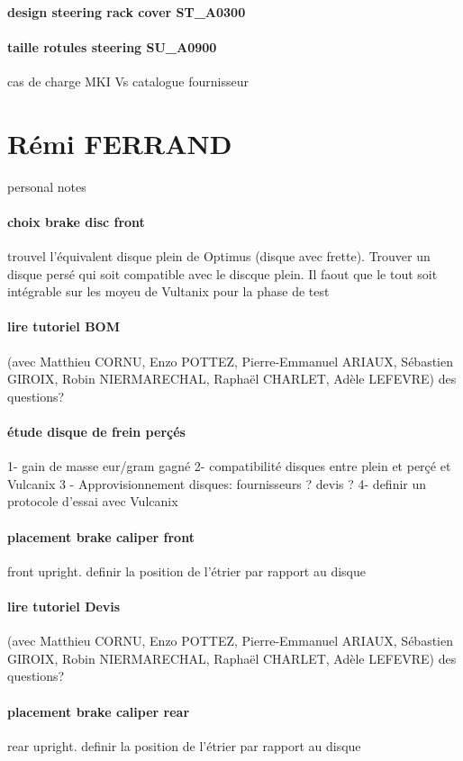 \paragraph{design steering rack cover ST\_A0300} 
\paragraph{taille rotules steering SU\_A0900} cas de charge MKI Vs catalogue fournisseur

 
 \newpage \section*{Rémi FERRAND} 
 \par personal notes
\paragraph{choix brake disc front} trouvel l'équivalent disque plein de Optimus (disque avec frette). Trouver un disque persé qui soit compatible avec le discque plein. Il faout que le tout soit intégrable sur les moyeu de Vultanix pour la phase de test
\paragraph{lire tutoriel BOM} (avec Matthieu CORNU, Enzo POTTEZ, Pierre-Emmanuel ARIAUX, Sébastien GIROIX, Robin NIERMARECHAL, Raphaël CHARLET, Adèle LEFEVRE) des questions?
\paragraph{étude disque de frein perçés} 1- gain de masse eur/gram gagné
2- compatibilité disques entre plein et perçé et Vulcanix
3 - Approvisionnement disques: fournisseurs ? devis ?
4- definir un protocole d'essai avec Vulcanix

\paragraph{placement brake caliper front} front upright. definir la position de l'étrier par rapport au disque
\paragraph{lire tutoriel Devis} (avec Matthieu CORNU, Enzo POTTEZ, Pierre-Emmanuel ARIAUX, Sébastien GIROIX, Robin NIERMARECHAL, Raphaël CHARLET, Adèle LEFEVRE) des questions?
\paragraph{placement brake caliper rear} rear upright. definir la position de l'étrier par rapport au disque
